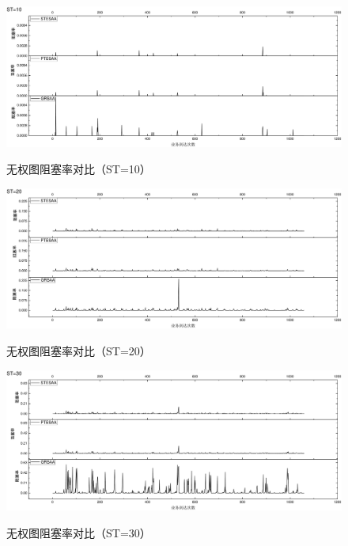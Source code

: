 \begin{figure}
\setlength{\abovecaptionskip}{-0.5cm}
\begin{center}
{\includegraphics[width=1 \textwidth]{figures/B10Z.pdf}}
\end{center}
\caption{{\footnotesize{无权图阻塞率对比（ST=10）}}}
\label{B10Z}
\end{figure}
\begin{figure}
\setlength{\abovecaptionskip}{-0.5cm}
\begin{center}
{\includegraphics[width=1 \textwidth]{figures/B20Z.pdf}}
\end{center}
\caption{{\footnotesize{无权图阻塞率对比（ST=20）}}}
\label{B20Z}
\end{figure}
\begin{figure}
\setlength{\abovecaptionskip}{-0.5cm}
\begin{center}
{\includegraphics[width=1 \textwidth]{figures/B30Z.pdf}}
\end{center}
\caption{{\footnotesize{无权图阻塞率对比（ST=30）}}}
\label{B40Z}
\end{figure}
